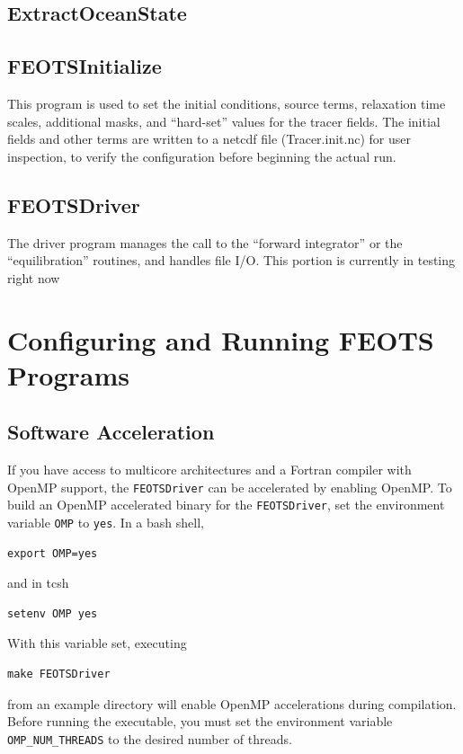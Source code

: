 \documentclass{softwaremanual}
\begin{document}
\section{ExtractOceanState}

\section{FEOTSInitialize}
This program is used to set the initial conditions, source terms, relaxation time scales, additional masks, and “hard-set” values for the tracer fields. The initial fields and other terms are written to a netcdf file (Tracer.init.nc) for user inspection, to verify the configuration before beginning the actual run.

\section{FEOTSDriver}
The driver program manages the call to the “forward integrator” or the “equilibration” routines, and handles file I/O. This portion is currently in testing right now

\chapter{Configuring and Running FEOTS Programs}

\section{Software Acceleration}
If you have access to multicore architectures and a Fortran compiler with OpenMP support, the \texttt{FEOTSDriver} can be accelerated by enabling OpenMP. To build an OpenMP accelerated binary for the \texttt{FEOTSDriver}, set the environment variable \texttt{OMP} to \texttt{yes}. In a bash shell,
\begin{verbatim}
export OMP=yes
\end{verbatim} 
and in tcsh
\begin{verbatim}
setenv OMP yes
\end{verbatim}
With this variable set, executing
\begin{verbatim}
make FEOTSDriver
\end{verbatim}
from an example directory will enable OpenMP accelerations during compilation. Before running the executable, you must set the environment variable \texttt{OMP\_NUM\_THREADS} to the desired number of threads.\\
\end{document}
